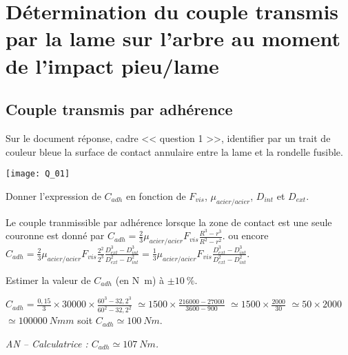 \documentclass[11pt]{article}
\begin{document}
\UPSTIpreambuleEpreuve	%



\section{Détermination du couple transmis par la lame sur l'arbre au moment de l'impact pieu/lame}

\subsection{Couple transmis par adhérence}

\UPSTIquestion* Sur le document réponse, cadre << question 1 >>, identifier par un trait de couleur bleue la surface de contact annulaire entre la lame et la rondelle fusible. 

\begin{UPSTIcorrige}

\begin{center}
\texttt{[image: Q\_01]}
\end{center}

\end{UPSTIcorrige}

\UPSTIquestion Donner l'expression de $C_{{adh}}$ en fonction de $F_{{vis}}$, $\mu_{{acier/acier}}$, $D_{{int}}$ et $D_{{ext}}$.

\begin{UPSTIcorrige}
Le couple tranmissible par adhérence lorsque la zone de contact est une seule couronne est donné par 
$C_{adh}=\frac{2}{3} \mu_{{acier/acier}}F_{{vis}} \frac{R^3-r^3}{R^2 - r^2}$.
 ou encore  $C_{adh}=\frac{2}{3} \mu_{{acier/acier}}F_{{vis}} \frac{2^2}{2^3}\frac{D_{{ext}}^3-D_{{int}}^3}{D_{{ext}}^2 - D_{{int}}^2}=\frac{1}{3} \mu_{{acier/acier}}F_{{vis}} \frac{D_{{ext}}^3-D_{{int}}^3}{D_{{ext}}^2 - D_{{int}}^2}$.
\end{UPSTIcorrige}


\UPSTIquestion Estimer la valeur de $C_{{adh}}$ (en \si{N.m}) à $\pm\SI{10}{\%}$.

\begin{UPSTIcorrige}
$C_{adh}=\frac{0,15}{3} \times 30000 \times \frac{60^3-32,2^3}{60^2 - 32,2^2}$
$\simeq 1500\times \frac{216000-27000}{3600 - 900}$
$\simeq 1500\times \frac{2000}{30}$
$\simeq 50\times 2000$
$\simeq \SI{100 000}{Nmm}$
soit $C_{adh}\simeq \SI{100}{Nm}$.

\textit{AN  -- Calculatrice : $C_{adh}\simeq \SI{107}{Nm}$.}

\end{UPSTIcorrige}
\end{document}
